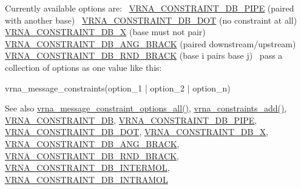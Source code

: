 Currently available options are\+:~\newline
\mbox{\hyperlink{group__hard__constraints_ga13053547a2de5532b64b64d35e097ae1}{V\+R\+N\+A\+\_\+\+C\+O\+N\+S\+T\+R\+A\+I\+N\+T\+\_\+\+D\+B\+\_\+\+P\+I\+PE}} (paired with another base)~\newline
\mbox{\hyperlink{group__hard__constraints_ga369bea82eae75fbe626f409fa425747e}{V\+R\+N\+A\+\_\+\+C\+O\+N\+S\+T\+R\+A\+I\+N\+T\+\_\+\+D\+B\+\_\+\+D\+OT}} (no constraint at all)~\newline
\mbox{\hyperlink{group__hard__constraints_ga7283bbe0f8954f7b030ecc3f2d1932b2}{V\+R\+N\+A\+\_\+\+C\+O\+N\+S\+T\+R\+A\+I\+N\+T\+\_\+\+D\+B\+\_\+X}} (base must not pair)~\newline
\mbox{\hyperlink{constraints__hard_8h_ad54c1315a47d55653dcaa5de6e544b77}{V\+R\+N\+A\+\_\+\+C\+O\+N\+S\+T\+R\+A\+I\+N\+T\+\_\+\+D\+B\+\_\+\+A\+N\+G\+\_\+\+B\+R\+A\+CK}} (paired downstream/upstream)~\newline
\mbox{\hyperlink{group__hard__constraints_gac17b034852c914bc5879954c65d7e74b}{V\+R\+N\+A\+\_\+\+C\+O\+N\+S\+T\+R\+A\+I\+N\+T\+\_\+\+D\+B\+\_\+\+R\+N\+D\+\_\+\+B\+R\+A\+CK}} (base i pairs base j)~\newline
 pass a collection of options as one value like this\+: \begin{DoxyVerb}vrna_message_constraints(option_1 | option_2 | option_n) \end{DoxyVerb}


\begin{DoxySeeAlso}{See also}
\mbox{\hyperlink{group__constraints_gaec7e13fa0465c2acc7a621d1aecb709f}{vrna\+\_\+message\+\_\+constraint\+\_\+options\+\_\+all()}}, \mbox{\hyperlink{group__constraints_ga35a401f680969a556858a8dd5f1d07cc}{vrna\+\_\+constraints\+\_\+add()}}, \mbox{\hyperlink{group__hard__constraints_ga4bfc2f15c4f261c62a11af9d2aa80c90}{V\+R\+N\+A\+\_\+\+C\+O\+N\+S\+T\+R\+A\+I\+N\+T\+\_\+\+DB}}, \mbox{\hyperlink{group__hard__constraints_ga13053547a2de5532b64b64d35e097ae1}{V\+R\+N\+A\+\_\+\+C\+O\+N\+S\+T\+R\+A\+I\+N\+T\+\_\+\+D\+B\+\_\+\+P\+I\+PE}}, \mbox{\hyperlink{group__hard__constraints_ga369bea82eae75fbe626f409fa425747e}{V\+R\+N\+A\+\_\+\+C\+O\+N\+S\+T\+R\+A\+I\+N\+T\+\_\+\+D\+B\+\_\+\+D\+OT}}, \mbox{\hyperlink{group__hard__constraints_ga7283bbe0f8954f7b030ecc3f2d1932b2}{V\+R\+N\+A\+\_\+\+C\+O\+N\+S\+T\+R\+A\+I\+N\+T\+\_\+\+D\+B\+\_\+X}}, \mbox{\hyperlink{constraints__hard_8h_ad54c1315a47d55653dcaa5de6e544b77}{V\+R\+N\+A\+\_\+\+C\+O\+N\+S\+T\+R\+A\+I\+N\+T\+\_\+\+D\+B\+\_\+\+A\+N\+G\+\_\+\+B\+R\+A\+CK}}, \mbox{\hyperlink{group__hard__constraints_gac17b034852c914bc5879954c65d7e74b}{V\+R\+N\+A\+\_\+\+C\+O\+N\+S\+T\+R\+A\+I\+N\+T\+\_\+\+D\+B\+\_\+\+R\+N\+D\+\_\+\+B\+R\+A\+CK}}, \mbox{\hyperlink{group__hard__constraints_ga31d0ebb9755ca8a4acafc14f00ca755d}{V\+R\+N\+A\+\_\+\+C\+O\+N\+S\+T\+R\+A\+I\+N\+T\+\_\+\+D\+B\+\_\+\+I\+N\+T\+E\+R\+M\+OL}}, \mbox{\hyperlink{group__hard__constraints_ga5c17253f5a39d1d49b0fb11f5196982a}{V\+R\+N\+A\+\_\+\+C\+O\+N\+S\+T\+R\+A\+I\+N\+T\+\_\+\+D\+B\+\_\+\+I\+N\+T\+R\+A\+M\+OL}}
\end{DoxySeeAlso}

